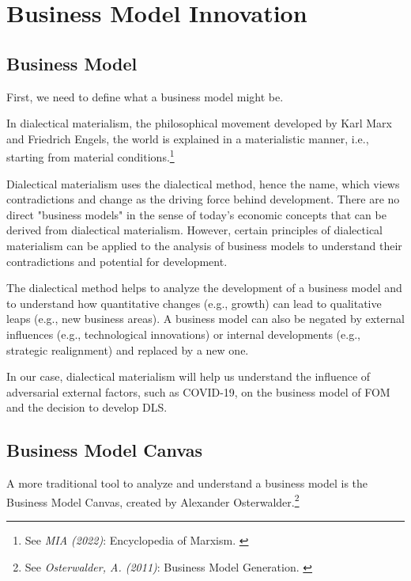 %
%

\pagebreak
\section{Business Model Innovation}

\onehalfspacing

\subsection{Business Model}

First, we need to define what a business model might be.

In dialectical materialism, the philosophical movement developed by Karl Marx and Friedrich Engels, the world is explained in a materialistic manner, i.e., starting from material conditions.\footnote{See \textit{MIA (2022)}: Encyclopedia of Marxism. \cite{diaMat}}

Dialectical materialism uses the dialectical method, hence the name, which views contradictions and change as the driving force behind development. There are no direct "business models" in the sense of today's economic concepts that can be derived from dialectical materialism. However, certain principles of dialectical materialism can be applied to the analysis of business models to understand their contradictions and potential for development.

The dialectical method helps to analyze the development of a business model and to understand how quantitative changes (e.g., growth) can lead to qualitative leaps (e.g., new business areas). A business model can also be negated by external influences (e.g., technological innovations) or internal developments (e.g., strategic realignment) and replaced by a new one.

In our case, dialectical materialism will help us understand the influence of adversarial external factors, such as COVID-19, on the business model of FOM and the decision to develop DLS.

\subsection{Business Model Canvas}

A more traditional tool to analyze and understand a business model is the Business Model Canvas, created by Alexander Osterwalder.\footnote{See \textit{Osterwalder, A. (2011)}: Business Model Generation. \cite{alexBmc}}

